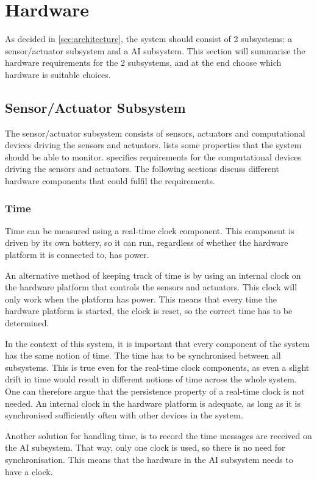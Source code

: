\section{Hardware}
As decided in \cref{sec:architecture}, the system should consist of 2 subsystems: a sensor/actuator subsystem and a AI subsystem. This section will summarise the hardware requirements for the 2 subsystems, and at the end choose which hardware is suitable choices.

\subsection{Sensor/Actuator Subsystem}
The sensor/actuator subsystem consists of sensors, actuators and computational devices driving the sensors and actuators.  lists some properties that the system should be able to monitor.  specifies requirements for the computational devices driving the sensors and actuators. The following sections discuss different hardware components that could fulfil the requirements.

\subsubsection{Time}
Time can be measured using a real-time clock component. This component is driven by its own battery, so it can run, regardless of whether the hardware platform it is connected to, has power.

An alternative method of keeping track of time is by using an internal clock on the hardware platform that controls the sensors and actuators. This clock will only work when the platform has power. This means that every time the hardware platform is started, the clock is reset, so the correct time has to be determined.

In the context of this system, it is important that every component of the system has the same notion of time. The time has to be synchronised between all subsystems. This is true even for the real-time clock components, as even a slight drift in time would result in different notions of time across the whole system. One can therefore argue that the persistence property of a real-time clock is not needed. An internal clock in the hardware platform is adequate, as long as it is synchronised sufficiently often with other devices in the system.

Another solution for handling time, is to record the time messages are received on the AI subsystem. That way, only one clock is used, so there is no need for synchronisation. This means that the hardware in the AI subsystem needs to have a clock.

